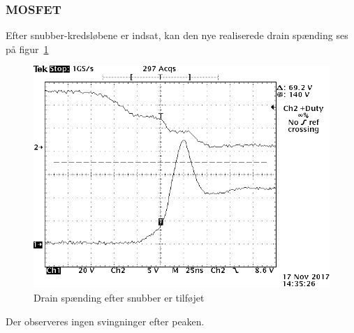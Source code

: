 \subsubsection{MOSFET}
\noindent Efter snubber-kredsløbene er indsat, kan den nye realiserede drain spænding ses på figur~\ref{fig:realiseirng_snubber_MOSFET_3} 
\begin{figure}[H]
	\center
	\includegraphics[max width=0.7\linewidth]{../dokumentation/tex/3iteration/billeder/Realisering/Realisering_switch_tid.PNG}
	\caption{Drain spænding efter snubber er tilføjet}
	\label{fig:realiseirng_snubber_MOSFET_3}
\end{figure} 
\noindent Der observeres ingen svingninger efter peaken.

